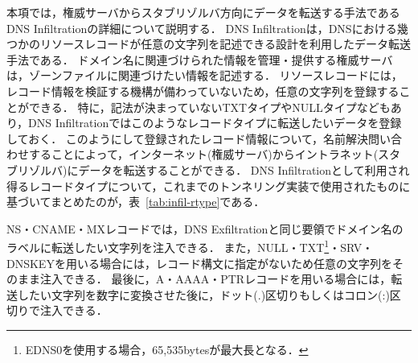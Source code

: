本項では，権威サーバからスタブリゾルバ方向にデータを転送する手法であるDNS Infiltrationの詳細について説明する．
DNS Infiltrationは，DNSにおける幾つかのリソースレコードが任意の文字列を記述できる設計を利用したデータ転送手法である．
ドメイン名に関連づけられた情報を管理・提供する権威サーバは，ゾーンファイルに関連づけたい情報を記述する．
リソースレコードには，レコード情報を検証する機構が備わっていないため，任意の文字列を登録することができる．
特に，記法が決まっていないTXTタイプやNULLタイプなどもあり，DNS Infiltrationではこのようなレコードタイプに転送したいデータを登録しておく．
このようにして登録されたレコード情報について，名前解決問い合わせすることによって，インターネット(権威サーバ)からイントラネット(スタブリゾルバ)にデータを転送することができる．
DNS Infiltrationとして利用され得るレコードタイプについて，これまでのトンネリング実装で使用されたものに基づいてまとめたのが，表~\ref{tab:infil-rtype}である．



\newpage
NS・CNAME・MXレコードでは，DNS Exfiltrationと同じ要領でドメイン名のラベルに転送したい文字列を注入できる．
また，NULL・TXT\footnote{EDNS0を使用する場合，65,535bytesが最大長となる．}・SRV・DNSKEYを用いる場合には，レコード構文に指定がないため任意の文字列をそのまま注入できる．
最後に，A・AAAA・PTRレコードを用いる場合には，転送したい文字列を数字に変換させた後に，ドット(.)区切りもしくはコロン(:)区切りで注入できる．

